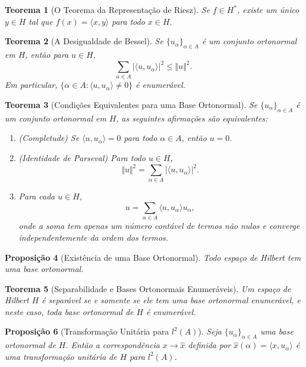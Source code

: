 \documentclass[12pt]{article}
\newtheorem{theorem}{Teorema}[section]
\newtheorem{proposition}[theorem]{Proposição}
\begin{document}
\begin{multicols}{3}
\begin{theorem}[O Teorema da Representação de Riesz]
Se $f \in H^*$, existe um único $y \in H$ tal que $f(x) = \langle x, y \rangle$ para todo $x \in H$.
\end{theorem}

\begin{theorem}[A Desigualdade de Bessel]
Se $\{u_\alpha\}_{\alpha \in A}$ é um conjunto ortonormal em $H$, então para $u \in H$,
\[
\sum_{\alpha \in A} |\langle u, u_\alpha \rangle|^2 \le \Vert u \Vert^2.
\]
Em particular, $\{\alpha \in A : \langle u, u_\alpha \rangle \neq 0\}$ é enumerável.
\end{theorem}

\begin{theorem}[Condições Equivalentes para uma Base Ortonormal]
Se $\{u_\alpha\}_{\alpha \in A}$ é um conjunto ortonormal em $H$, as seguintes afirmações são equivalentes:
\begin{enumerate}[label=(\alph*)]
    \item (Completude) Se $\langle u, u_\alpha \rangle = 0$ para todo $\alpha \in A$, então $u = 0$.
    \item (Identidade de Parseval) Para todo $u \in H$,
    \[
    \Vert u \Vert^2 = \sum_{\alpha \in A} |\langle u, u_\alpha \rangle|^2.
    \]
    \item Para cada $u \in H$,
    \[
    u = \sum_{\alpha \in A} \langle u, u_\alpha \rangle u_\alpha,
    \]
    onde a soma tem apenas um número contável de termos não nulos e converge independentemente da ordem dos termos.
\end{enumerate}
\end{theorem}

\begin{proposition}[Existência de uma Base Ortonormal]
Todo espaço de Hilbert tem uma base ortonormal.
\end{proposition}

\begin{theorem}[Separabilidade e Bases Ortonormais Enumeráveis]
Um espaço de Hilbert $H$ é separável se e somente se ele tem uma base ortonormal enumerável, e neste caso, toda base ortonormal de $H$ é enumerável.
\end{theorem}

\begin{proposition}[Transformação Unitária para $l^2(A)$]
Seja $\{u_\alpha\}_{\alpha \in A}$ uma base ortonormal de $H$. Então a correspondência $x \to \hat{x}$ definida por $\hat{x}(\alpha) = \langle x, u_\alpha \rangle$ é uma transformação unitária de $H$ para $l^2(A)$.
\end{proposition}
\end{multicols}
\end{document}
